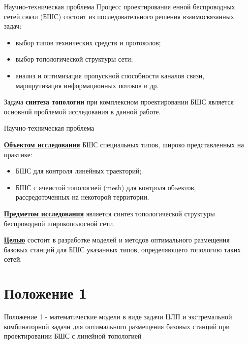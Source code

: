 \begin{frame}
    {Научно-техническая проблема}
    Процесс проектирования енной беспроводных сетей связи (БШС) состоит из последовательного решения взаимосвязанных задач:
    
    \bigskip

    \begin{itemize}
        \item выбор типов технических средств и протоколов;
        \item выбор топологической структуры сети;
        \item анализ и оптимизация пропускной способности каналов связи, маршрутизация информационных потоков и др.
    \end{itemize}

    \bigskip
    
    Задача \textbf{синтеза топологии} при комплексном проектировании БШС является основной проблемой исследования в данной работе.

\end{frame}

\begin{frame}
    {Научно-техническая проблема}

    \textbf{\underline{Объектом исследования}} БШС специальных типов, широко представленных на практике:
    
    \bigskip

    \begin{itemize}
        \item БШС для контроля линейных траекторий;
        \item БШС с ячеистой топологией (mesh) для контроля объектов, рассредоточенных на некоторой территории.
    \end{itemize}

    \bigskip

    \textbf{\underline{Предметом исследования}} является синтез топологической структуры беспроводной широкополосной сети.

    \bigskip
    
    \textbf{\underline{Целью}} состоит в разработке моделей и методов оптимального размещения базовых станций для БШС указанных типов, определяющего топологию таких сетей.
\end{frame}

\section{Положение 1}
\begin{frame}
    \begin{center}
        {Положение 1 - математические модели в виде задачи ЦЛП и экстремальной комбинаторной задачи для оптимального размещения базовых станций при проектировании БШС с линейной топологией}
    \end{center}
\end{frame}

